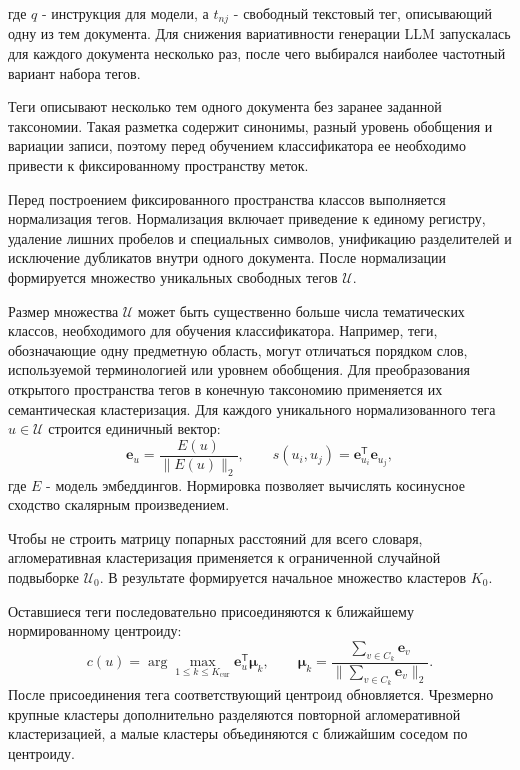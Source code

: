 \documentclass[12pt,a4paper]{article}
\begin{document}
где $q$ - инструкция для модели, а ${t}_{nj}$ - свободный текстовый тег, описывающий одну из тем документа. 
Для снижения вариативности генерации LLM запускалась для каждого документа несколько раз, после чего выбирался наиболее частотный вариант набора тегов.

Теги описывают несколько тем одного документа без заранее заданной таксономии.
Такая разметка содержит синонимы, разный уровень обобщения и вариации записи,
поэтому перед обучением классификатора ее необходимо привести к фиксированному пространству меток.

Перед построением фиксированного пространства классов выполняется нормализация тегов. 
Нормализация включает приведение к единому регистру, удаление лишних пробелов и специальных символов, 
унификацию разделителей и исключение дубликатов внутри одного документа.
После нормализации формируется множество уникальных свободных тегов $\mathcal{U}$.

Размер множества $\mathcal{U}$ может быть существенно больше числа тематических классов, 
необходимого для обучения классификатора. Например, теги, обозначающие одну предметную область, 
могут отличаться порядком слов, используемой терминологией или уровнем обобщения. 
Для преобразования открытого пространства тегов в конечную таксономию применяется их семантическая кластеризация.
Для каждого уникального нормализованного тега
$u\in\mathcal{U}$ строится единичный вектор:
\begin{equation}
\mathbf e_u=\frac{E(u)}{\|E(u)\|_2},
\qquad
s(u_i,u_j)=\mathbf e_{u_i}^{\mathsf T}\mathbf e_{u_j},
\end{equation}
где $E$ - модель эмбеддингов.
Нормировка позволяет вычислять косинусное сходство скалярным произведением.

Чтобы не строить матрицу попарных расстояний для всего словаря,
агломеративная кластеризация применяется к ограниченной случайной подвыборке $\mathcal U_0$.
В результате формируется начальное множество кластеров $K_0$. 

Оставшиеся теги последовательно присоединяются к ближайшему нормированному центроиду:
\begin{equation}
c(u)=\arg\max_{1\leq k\leq K_{\mathrm{cur}}}
\mathbf e_u^{\mathsf T}\boldsymbol\mu_k,
\qquad
\boldsymbol\mu_k=
\frac{\sum_{v\in C_k}\mathbf e_v}{\|\sum_{v\in C_k}\mathbf e_v\|_2}.
\end{equation}
После присоединения тега соответствующий центроид обновляется.
Чрезмерно крупные кластеры дополнительно разделяются повторной агломеративной кластеризацией, 
а малые кластеры объединяются с ближайшим соседом по центроиду.
\end{document}
